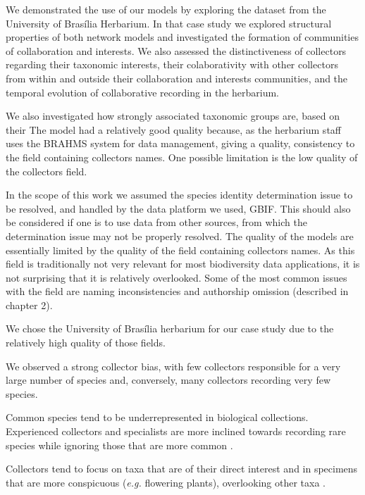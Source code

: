 We demonstrated the use of our models by exploring the dataset from the University of Brasília Herbarium.
In that case study we explored structural properties of both network models and investigated the formation of communities of collaboration and interests.
We also assessed the distinctiveness of collectors regarding their taxonomic interests, their colaborativity with other collectors from within and outside their collaboration and interests communities, and the temporal evolution of collaborative recording in the herbarium.


We also investigated how strongly associated taxonomic groups are, based on their
The model had a relatively good quality because, as the herbarium staff uses the BRAHMS system for data management, giving a quality, consistency to the field containing collectors names.
One possible limitation is the low quality of the collectors field.




In the scope of this work we assumed the species identity determination issue to be resolved, and handled by the data platform we used, GBIF. 
This should also be considered if one is to use data from other sources, from which the determination issue may not be properly resolved.
The quality of the models are essentially limited by the quality of the field containing collectors names.
As this field is traditionally not very relevant for most biodiversity data applications, it is not surprising that it is relatively overlooked.
Some of the most common issues with the field are naming inconsistencies and authorship omission (described in chapter 2).




We chose the University of Brasília herbarium for our case study due to the relatively high quality of those fields.

We observed a strong collector bias, with few collectors responsible for a very large number of species and, conversely, many collectors recording very few species.

Common species tend to be underrepresented in biological collections.
Experienced collectors and specialists are more inclined towards recording rare species while ignoring those that are more common \cite{Nelson1990}.

Collectors tend to focus on taxa that are of their direct interest and in specimens that are more conspicuous (\textit{e.g.} flowering plants), overlooking other taxa \cite{VanGemerden2005}.




